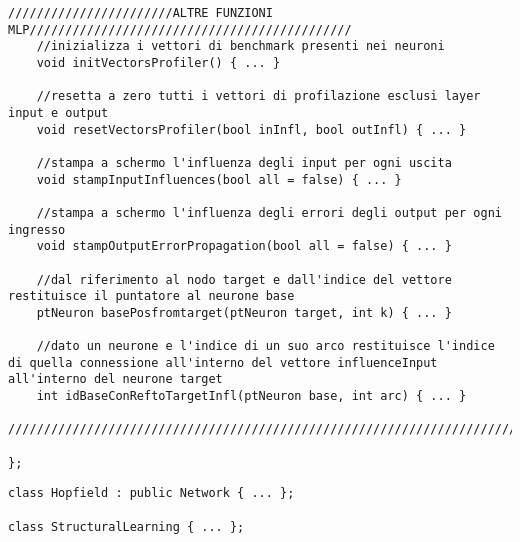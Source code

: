 \documentclass[10pt,a4paper]{article}
\begin{document}
\begin{lstlisting}[style=mycuda, caption=class MLP, captionpos=b]
	///////////////////////ALTRE FUNZIONI MLP/////////////////////////////////////////////
	//inizializza i vettori di benchmark presenti nei neuroni
	void initVectorsProfiler() { ... }
	
	//resetta a zero tutti i vettori di profilazione esclusi layer input e output
	void resetVectorsProfiler(bool inInfl, bool outInfl) { ... }
	
	//stampa a schermo l'influenza degli input per ogni uscita
	void stampInputInfluences(bool all = false) { ... }
	
	//stampa a schermo l'influenza degli errori degli output per ogni ingresso
	void stampOutputErrorPropagation(bool all = false) { ... }
	
	//dal riferimento al nodo target e dall'indice del vettore restituisce il puntatore al neurone base
	ptNeuron basePosfromtarget(ptNeuron target, int k) { ... }
	
	//dato un neurone e l'indice di un suo arco restituisce l'indice di quella connessione all'interno del vettore influenceInput all'interno del neurone target
	int idBaseConReftoTargetInfl(ptNeuron base, int arc) { ... }
	//////////////////////////////////////////////////////////////////////////////////////

};

\end{lstlisting}

\begin{lstlisting}[style=mycuda, caption=altre classi, captionpos=b]
class Hopfield : public Network { ... };

class StructuralLearning { ... };
\end{lstlisting}
\end{document}
